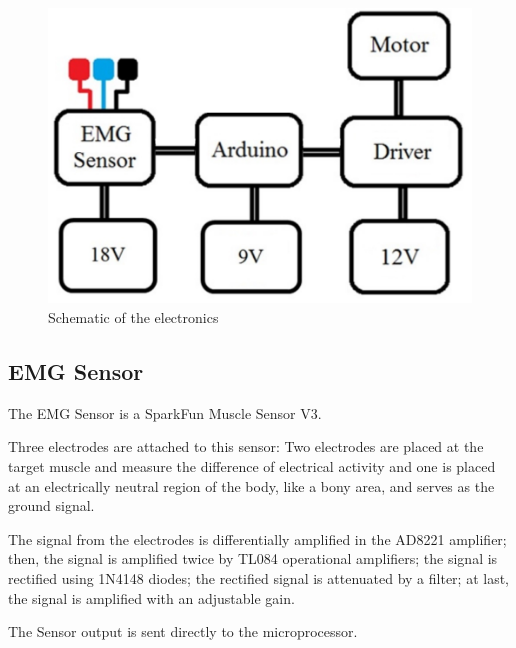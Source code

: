    \begin{figure}[thpb]
      \centering
      \includegraphics[scale=0.5]{Images/ElectronicSchematic.jpg}
      \caption{Schematic of the electronics \cite{Sommer2015}}
      \label{ElectronicSchematic}
   \end{figure}
   
   \subsection{EMG Sensor}
   
   The EMG Sensor is a SparkFun Muscle Sensor V3. 
   
   Three electrodes are attached to this sensor: Two electrodes are placed at the target muscle and measure the difference of electrical activity and one is placed at an electrically neutral region of the body, like a bony area, and serves as the ground signal.
   
   The signal from the electrodes is differentially amplified in the AD8221 amplifier; then, the signal is amplified twice by TL084 operational amplifiers; the signal is rectified using 1N4148 diodes; the rectified signal is attenuated by a filter; at last, the signal is amplified with an adjustable gain.
   
   The Sensor output is sent directly to the microprocessor. 
   
   
